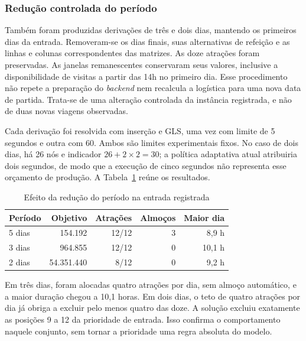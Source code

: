 \subsubsection{Redução controlada do período}
\label{sec:reducao-periodo}

Também foram produzidas derivações de três e dois dias, mantendo os primeiros dias da entrada. Removeram-se os dias finais, suas alternativas de refeição e as linhas e colunas correspondentes das matrizes. As doze atrações foram preservadas. As janelas remanescentes conservaram seus valores, inclusive a disponibilidade de visitas a partir das 14h no primeiro dia. Esse procedimento não repete a preparação do \textit{backend} nem recalcula a logística para uma nova data de partida. Trata-se de uma alteração controlada da instância registrada, e não de duas novas viagens observadas.

Cada derivação foi resolvida com inserção e GLS, uma vez com limite de 5 segundos e outra com 60. Ambos são limites experimentais fixos. No caso de dois dias, há 26 nós e indicador $26+2\times2=30$; a política adaptativa atual atribuiria dois segundos, de modo que a execução de cinco segundos não representa esse orçamento de produção. A Tabela~\ref{tab:reducao-periodo} reúne os resultados.

\begin{table}[H]
\centering
\small
\caption{Efeito da redução do período na entrada registrada}
\label{tab:reducao-periodo}
\begin{tabular}{lrrrr}
\hline
\textbf{Período} & \textbf{Objetivo} & \textbf{Atrações} & \textbf{Almoços} & \textbf{Maior dia} \\
\hline
5 dias & 154.192 & 12/12 & 3 & 8,9 h \\
3 dias & 964.855 & 12/12 & 0 & 10,1 h \\
2 dias & 54.351.440 & 8/12 & 0 & 9,2 h \\
\hline
\end{tabular}
\end{table}

Em três dias, foram alocadas quatro atrações por dia, sem almoço automático, e a maior duração chegou a 10,1 horas. Em dois dias, o teto de quatro atrações por dia já obriga a excluir pelo menos quatro das doze. A solução excluiu exatamente as posições 9 a 12 da prioridade de entrada. Isso confirma o comportamento naquele conjunto, sem tornar a prioridade uma regra absoluta do modelo.

